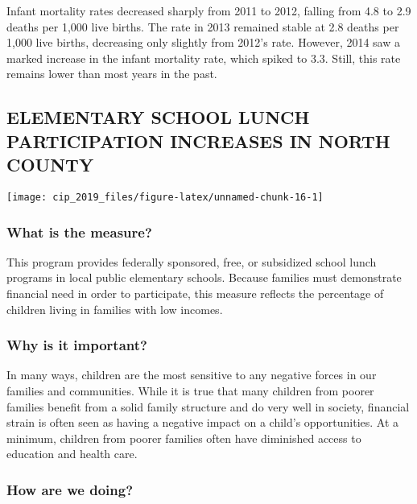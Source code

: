 \documentclass[]{book}
\theoremstyle{definition}
\theoremstyle{definition}
\theoremstyle{definition}
\theoremstyle{remark}
\begin{document}
Infant mortality rates decreased sharply from 2011 to 2012, falling from
4.8 to 2.9 deaths per 1,000 live births. The rate in 2013 remained
stable at 2.8 deaths per 1,000 live births, decreasing only slightly
from 2012's rate. However, 2014 saw a marked increase in the infant
mortality rate, which spiked to 3.3. Still, this rate remains lower than
most years in the past.

\subsection*{ELEMENTARY SCHOOL LUNCH PARTICIPATION INCREASES IN NORTH
COUNTY}\label{elementary-school-lunch-participation-increases-in-north-county}

\texttt{[image: cip\_2019\_files/figure-latex/unnamed-chunk-16-1]}

\subsubsection*{What is the measure?}\label{what-is-the-measure-8}

This program provides federally sponsored, free, or subsidized school
lunch programs in local public elementary schools. Because families must
demonstrate financial need in order to participate, this measure
reflects the percentage of children living in families with low incomes.

\subsubsection*{Why is it important?}\label{why-is-it-important-7}

In many ways, children are the most sensitive to any negative forces in
our families and communities. While it is true that many children from
poorer families benefit from a solid family structure and do very well
in society, financial strain is often seen as having a negative impact
on a child's opportunities. At a minimum, children from poorer families
often have diminished access to education and health care.

\subsubsection*{How are we doing?}\label{how-are-we-doing-10}
\end{document}
